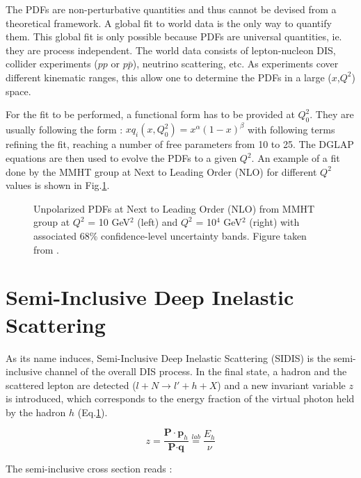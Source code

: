 The PDFs are non-perturbative quantities and thus cannot be devised from a theoretical framework. A global fit to world data is the
only way to quantify them. This global fit is only possible because PDFs are universal quantities, ie. they are process independent.
The world data consists of lepton-nucleon DIS, collider experiments ($pp$ or $p\bar{p}$), neutrino scattering, etc. As experiments
cover different kinematic ranges, this allow one to determine the PDFs in a large ($x$,$Q^2$) space.

For the fit to be performed, a functional form has to be provided at $Q^2_0$. They are usually following the form : $xq_i(x,Q^2_0) = x^{\alpha}(1-x)^{\beta}$
with following terms refining the fit, reaching a number of free parameters from 10 to 25. The DGLAP equations are then used to evolve
the PDFs to a given $Q^2$. An example of a fit done by the MMHT group at Next to Leading Order (NLO) for different $Q^2$ values is shown in Fig.\ref{fig:MMHT}.

\begin{figure}[htb!]
\centerline{}
\caption{Unpolarized PDFs at Next to Leading Order (NLO) from MMHT group at $Q^2$ = 10 GeV$^2$ (left) and $Q^2$ = 10$^4$ GeV$^2$ (right) with associated 68\%
confidence-level uncertainty bands. Figure taken from \cite{MMHT}.}\label{fig:MMHT}
\end{figure}


\section{Semi-Inclusive Deep Inelastic Scattering}

As its name induces, Semi-Inclusive Deep Inelastic Scattering (SIDIS) is the semi-inclusive channel of the overall DIS process. In the
final state, a hadron and the scattered lepton are detected ($l+N \rightarrow l'+h+X$) and a new invariant variable $z$ is introduced,
which corresponds to the energy fraction of the virtual photon held by the hadron $h$ (Eq.\ref{}).

\begin{equation}
  z = \frac{\textbf{P}\cdot\textbf{p}_h}{\textbf{P}\cdot\textbf{q}} \stackrel{lab}{=} \frac{E_h}{\nu}
\end{equation}

The semi-inclusive cross section reads \cite{}:

